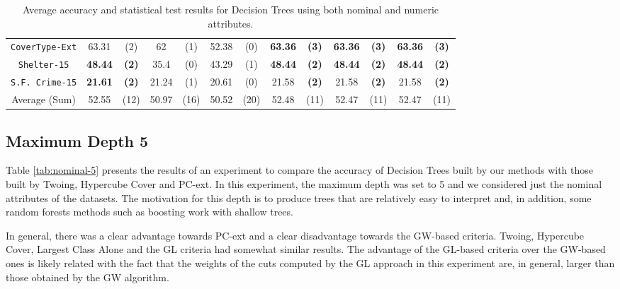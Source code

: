 \begin{table}
\begin{tabular}{c|cc|cc|cc|cc|cc|cc}
{\tt CoverType-Ext}& 63.31          &  (2)      & 62         & (1)          & 52.38       &  (0)              & {\bf 63.36} &  {\bf (3)}   & {\bf 63.36} & {\bf (3)}& {\bf 63.36} & {\bf (3)} \\  
{\tt Shelter-15}   & {\bf 48.44}    & {\bf (2)} & 35.4       & (0)          & 43.29       &  (1)              & {\bf 48.44} &  {\bf (2)}   & {\bf 48.44} & {\bf (2)}& {\bf 48.44} & {\bf (2)} \\   
{\tt S.F. Crime-15}& {\bf 21.61}    & {\bf (2)} & 21.24      & (1)          & 20.61       &  (0)              & 21.58       &  {\bf (2)}   & 21.58       & {\bf (2)}& 21.58       & {\bf (2)} \\ 
\hline
Average (Sum)      & 52.55          &  (12)     & 50.97      & (16)         & 50.52       &  (20)             & 52.48       &  (11)        & 52.47       &  (11)    & 52.47       & (11)

\end{tabular}
\caption{Average accuracy and statistical test results for  Decision Trees using both nominal and numeric attributes.}
\label{exp:numeric-1}
\normalsize
\end{table}



\subsection{Maximum Depth 5}
\label{subsec:depth-5}

Table \ref{tab:nominal-5} presents  the results of an experiment to
compare the accuracy of  Decision Trees built by  our methods with those built by Twoing, Hypercube Cover and PC-ext.
In this experiment, the maximum depth was set to 5 and we considered just the nominal attributes of the datasets. 
The motivation for this depth is to produce trees that
are relatively easy to interpret and, in addition, some random
forests methods such as boosting work with shallow trees.

In general, there was a clear advantage towards PC-ext and a clear disadvantage towards the GW-based criteria. Twoing, Hypercube Cover, Largest Class Alone and the GL criteria had somewhat similar results. The advantage of the GL-based criteria over the GW-based ones is likely related with the fact that the weights of the cuts computed by the GL approach in this experiment are, in general, larger than those obtained by the GW algorithm.


